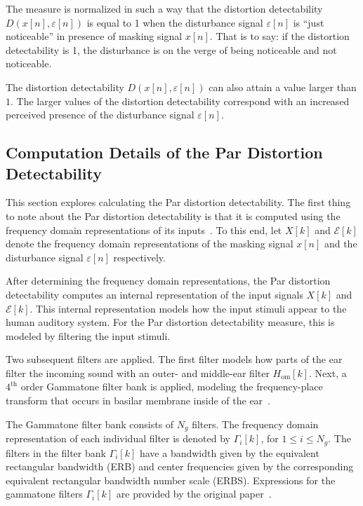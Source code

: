 The measure is normalized in such a way that the distortion detectability $D(x[n],\varepsilon[n])$ is equal to 1 when the 
disturbance signal $\varepsilon[n]$ is ``just noticeable'' in presence of masking signal $x[n]$.
That is to say: if the distortion detectability is 1, the disturbance is on the verge of being noticeable and not noticeable.

The distortion detectability $D(x[n],\varepsilon[n])$ can also attain a value larger than $1$.
The larger values of the distortion detectability correspond with an increased perceived presence of the
disturbance signal $\varepsilon[n]$.

\subsection{Computation Details of the Par Distortion Detectability}
\label{ch:perceptual:implementation:computation}
This section explores calculating the Par distortion detectability.
The first thing to note about the Par distortion detectability is that it is computed using the 
frequency domain representations of its inputs~\cite{van2005perceptual}. 
To this end, let $X[k]$ and $\mathcal{E}[k]$ denote the frequency domain representations of the masking signal $x[n]$ and 
the disturbance signal $\varepsilon[n]$ respectively.

After determining the frequency domain representations, 
the Par distortion detectability computes an internal representation of the input signals $X[k]$ and $\mathcal{E}[k]$.
This internal representation models how the input stimuli appear to the human auditory system.
For the Par distortion detectability measure, this is modeled by filtering the input stimuli.

Two subsequent filters are applied.
The first filter models how parts of the ear filter the incoming sound with an outer- and middle-ear filter $H_\text{om}[k]$. 
Next, a $4^\text{th}$ order Gammatone filter bank is applied, modeling the frequency-place transform that occurs in 
basilar membrane inside of the ear~\cite{van2005perceptual}.

The Gammatone filter bank consists of $N_g$ filters.
The frequency domain representation of each individual filter is denoted by $\Gamma_i[k]$, for $1 \leq i \leq N_g$. 
The filters in the filter bank $\Gamma_i[k]$ have a bandwidth given by the equivalent 
rectangular bandwidth (ERB) and center frequencies given by the corresponding equivalent rectangular bandwidth number
scale (ERBS).
Expressions for the gammatone filters $\Gamma_i[k]$ are provided by the original paper~\cite{van2005perceptual}.

